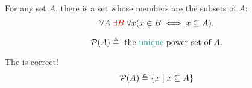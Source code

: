 \begin{frame}{}
  \begin{definition}
    For any set $A$, there is a set whose members are the subsets of $A$:
    \[
      \forall A\; \textcolor{red}{\exists B}\; \forall x (x \in B \iff x \subseteq A).
    \]
  \end{definition}

  \pause
  \vspace{0.50cm}
  \begin{definition}[``$\mathcal{P}(A)$'']
    \[
      \mathcal{P}(A) \triangleq \text{ the \textcolor{teal}{unique} power set of } A.
    \]
  \end{definition}

  \pause
  \vspace{0.50cm}
  \begin{alertblock}{The is  correct!}
    \[
      \mathcal{P}(A) \triangleq \{x \mid x \subseteq A\}
    \]
  \end{alertblock}
\end{frame}
